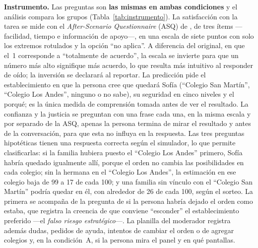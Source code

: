 \textbf{Instrumento.} Las preguntas son \textbf{las mismas en ambas condiciones} y el análisis compara los grupos (Tabla~\ref{tab:instrumento}). La satisfacción con la tarea se mide con el \emph{After-Scenario Questionnaire} (ASQ) de \citet{lewis1991asq}, de tres ítems ---facilidad, tiempo e información de apoyo---, en una escala de siete puntos con solo los extremos rotulados y la opción ``no aplica''. A diferencia del original, en que el~1 corresponde a ``totalmente de acuerdo'', la escala se invierte para que un número más alto signifique más acuerdo, lo que resulta más intuitivo al responder de oído; la inversión se declarará al reportar. La predicción pide el establecimiento en que la persona cree que quedará Sofía (``Colegio San Martín'', ``Colegio Los Andes'', ninguno o no sabe), su seguridad en cinco niveles y el porqué; es la única medida de comprensión tomada antes de ver el resultado. La confianza y la justicia se preguntan con una frase cada una, en la misma escala y por separado de la ASQ, apenas la persona termina de mirar el resultado y antes de la conversación, para que esta no influya en la respuesta. Las tres preguntas hipotéticas tienen una respuesta correcta según el simulador, lo que permite clasificarlas: si la familia hubiera puesto el ``Colegio Los Andes'' primero, Sofía habría quedado igualmente allí, porque el orden no cambia las posibilidades en cada colegio; sin la hermana en el ``Colegio Los Andes'', la estimación en ese colegio baja de 99 a 17 de cada 100; y una familia sin vínculo con el ``Colegio San Martín'' podría quedar en él, con alrededor de 26 de cada 100, según el sorteo. La primera se acompaña de la pregunta de si la persona habría dejado el orden como estaba, que registra la creencia de que conviene ``esconder'' el establecimiento preferido ---el \emph{falso riesgo estratégico}---. La planilla del moderador registra además dudas, pedidos de ayuda, intentos de cambiar el orden o de agregar colegios y, en la condición~A, si la persona mira el panel y en qué pantallas.

